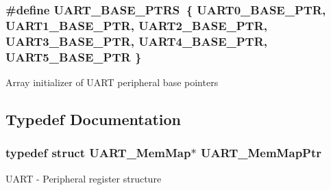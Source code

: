 \subsubsection[{U\+A\+R\+T\+\_\+\+B\+A\+S\+E\+\_\+\+P\+T\+R\+S}]{\setlength{\rightskip}{0pt plus 5cm}\#define U\+A\+R\+T\+\_\+\+B\+A\+S\+E\+\_\+\+P\+T\+R\+S~\{ {\bf U\+A\+R\+T0\+\_\+\+B\+A\+S\+E\+\_\+\+P\+T\+R}, {\bf U\+A\+R\+T1\+\_\+\+B\+A\+S\+E\+\_\+\+P\+T\+R}, {\bf U\+A\+R\+T2\+\_\+\+B\+A\+S\+E\+\_\+\+P\+T\+R}, {\bf U\+A\+R\+T3\+\_\+\+B\+A\+S\+E\+\_\+\+P\+T\+R}, {\bf U\+A\+R\+T4\+\_\+\+B\+A\+S\+E\+\_\+\+P\+T\+R}, {\bf U\+A\+R\+T5\+\_\+\+B\+A\+S\+E\+\_\+\+P\+T\+R} \}}\label{group___u_a_r_t___peripheral_ga7b34a38b9492a1e1007b2f66383aef17}
Array initializer of U\+A\+R\+T peripheral base pointers 

\subsection{Typedef Documentation}
\hypertarget{group___u_a_r_t___peripheral_ga306cf44b593fadbb29a065f42e3f68f0}{}
\subsubsection[{U\+A\+R\+T\+\_\+\+Mem\+Map\+Ptr}]{\setlength{\rightskip}{0pt plus 5cm}typedef struct {\bf U\+A\+R\+T\+\_\+\+Mem\+Map}$\ast$ {\bf U\+A\+R\+T\+\_\+\+Mem\+Map\+Ptr}}\label{group___u_a_r_t___peripheral_ga306cf44b593fadbb29a065f42e3f68f0}
U\+A\+R\+T -\/ Peripheral register structure 
